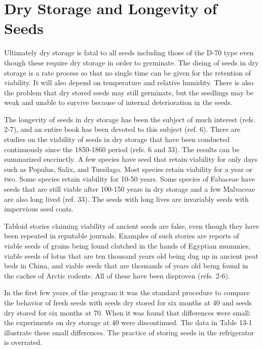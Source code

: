\chapter{Dry Storage and Longevity of Seeds}

Ultimately dry storage is fatal to all seeds including those of the D-70 type even
though these require dry storage in order to germinate. The dieing of seeds in dry
storage is a rate process so that no single time can be given for the retention of
viability. It will also depend on temperature and relative humidity. There is also the
problem that dry stored seeds may still germinate, but the seedlings may be weak and
unable to survive because of internal deterioration in the seeds.

The longevity of seeds in dry storage has been the subject of much interest
(refs. 2-7), and an entire book has been devoted to this subject (ref. 6). There are
studies on the viability of seeds in dry storage that have been conducted continuously
since the 1850-1860 period (refs. 6 and 33). The results can be summarized
succinctly. A few species have seed that retain viability for only days such as Populus,
Salix, and Tussilago. Most species retain viability for a year or two. Some species
retain viability for 10-50 years. Some species of Fabaceae have seeds that are still
viable after 100-150 years in dry storage and a few Malvaceae are also long lived (ref.
33). The seeds with long lives are invariably seeds with impervious seed coats.

Tabloid stories claiming viability of ancient seeds are false, even though they
have been repeated in reputable journals. Examples of such stories are reports of
viable seeds of grains being found clutched in the hands of Egyptian mummies, viable
seeds of lotus that are ten thousand years old being dug up in ancient peat beds in
China, and viable seeds that are thousands of years old being found in the caches of
Arctic rodents. All of these have been disproven (refs. 2-6).

In the first few years of the program it was the standard procedure to compare
the behavior of fresh seeds with seeds dry stored for six months at 40 and seeds dry
stored for six months at 70. When it was found that differences were small: the
experiments on dry storage at 40 were discontinued. The data in Table 13-1 illustrate
these small differences. The practice of storing seeds in the refrigerator is overrated.

